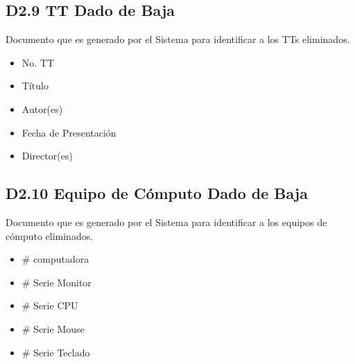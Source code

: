    \subsection{D2.9 TT Dado de Baja}

  Documento que es generado por el Sistema para identificar a los TTs eliminados.
  
  \begin{itemize}
  \item No. TT
  \item Título
  \item Autor(es)
  \item Fecha de Presentación
  \item Director(es)
  \end{itemize}

\subsection{D2.10 Equipo de Cómputo Dado de Baja}

  Documento que es generado por el Sistema para identificar a los equipos de cómputo eliminados.
  
  \begin{itemize}
  \item \# computadora
  \item \# Serie Monitor
  \item \# Serie CPU
  \item \# Serie Mouse
  \item \# Serie Teclado
  \end{itemize}











